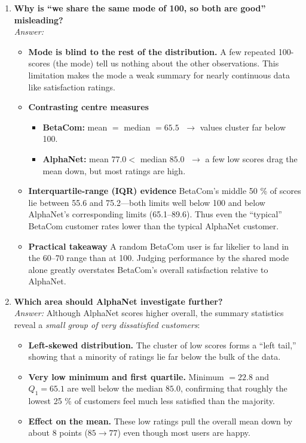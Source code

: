 \documentclass[12pt]{article}
\begin{document}
\begin{enumerate}[label=2.\arabic*]
\item \textbf{Why is “we share the same mode of 100, so both are good” misleading?}\\[2pt]
\textit{Answer:}
\begin{itemize}
    \item \textbf{Mode is blind to the rest of the distribution.}  
          A few repeated 100-scores (the mode) tell us nothing about the other observations.  This limitation makes the mode a weak summary for nearly continuous data like satisfaction ratings.
    \item \textbf{Contrasting centre measures}  
          \begin{itemize}
              \item \textbf{BetaCom:} mean \(=\) median \(=65.5\) \(\;\to\) values cluster far below 100.  
              \item \textbf{AlphaNet:} mean \(77.0<\) median \(85.0\) \(\;\to\) a few low scores drag the mean down, but most ratings are high.
          \end{itemize}
    \item \textbf{Interquartile-range (IQR) evidence}  
          BetaCom’s middle 50 \% of scores lie between 55.6 and 75.2—both limits well below 100 and below AlphaNet’s corresponding limits (65.1–89.6).  Thus even the “typical” BetaCom customer rates lower than the typical AlphaNet customer.
    \item \textbf{Practical takeaway}  
          A random BetaCom user is far likelier to land in the 60–70 range than at 100.  Judging performance by the shared mode alone greatly overstates BetaCom’s overall satisfaction relative to AlphaNet.
\end{itemize}

\item \textbf{Which area should AlphaNet investigate further?}\\[2pt]
    \textit{Answer:}
Although AlphaNet scores higher overall, the summary statistics reveal a \emph{small group of very dissatisfied customers}:
\begin{itemize}
    \item \textbf{Left-skewed distribution.}  
          The cluster of low scores forms a ``left tail,” showing that a minority of ratings lie far below the bulk of the data.
    \item \textbf{Very low minimum and first quartile.}  
          Minimum \(=22.8\) and \(Q_1=65.1\) are well below the median \(85.0\), confirming that roughly the lowest 25 \% of customers feel much less satisfied than the majority.
    \item \textbf{Effect on the mean.}  
          These low ratings pull the overall mean down by about 8 points (\(85\to77\)) even though most users are happy.


\end{itemize}
\end{enumerate}
\end{document}
